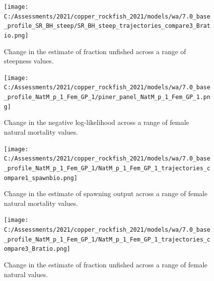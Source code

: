 \documentclass[11pt,
  english,
  a4paper,
]{article}
\begin{document}
\tagmcend\tagstructend


\begin{figure}
\centering
\texttt{[image: C:/Assessments/2021/copper\_rockfish\_2021/models/wa/7.0\_base\_profile\_SR\_BH\_steep/SR\_BH\_steep\_trajectories\_compare3\_Bratio.png]}
\caption{Change in the estimate of fraction unfished across a range of steepness values.\label{fig:h-depl}}
\end{figure}

\tagmcend\tagstructend


\begin{figure}
\centering
\texttt{[image: C:/Assessments/2021/copper\_rockfish\_2021/models/wa/7.0\_base\_profile\_NatM\_p\_1\_Fem\_GP\_1/piner\_panel\_NatM\_p\_1\_Fem\_GP\_1.png]}
\caption{Change in the negative log-likelihood across a range of female natural mortality values.\label{fig:m-profile}}
\end{figure}

\tagmcend\tagstructend


\begin{figure}
\centering
\texttt{[image: C:/Assessments/2021/copper\_rockfish\_2021/models/wa/7.0\_base\_profile\_NatM\_p\_1\_Fem\_GP\_1/NatM\_p\_1\_Fem\_GP\_1\_trajectories\_compare1\_spawnbio.png]}
\caption{Change in the estimate of spawning output across a range of female natural mortality values.\label{fig:m-ssb}}
\end{figure}

\tagmcend\tagstructend


\begin{figure}
\centering
\texttt{[image: C:/Assessments/2021/copper\_rockfish\_2021/models/wa/7.0\_base\_profile\_NatM\_p\_1\_Fem\_GP\_1/NatM\_p\_1\_Fem\_GP\_1\_trajectories\_compare3\_Bratio.png]}
\caption{Change in the estimate of fraction unfished across a range of female natural values.\label{fig:m-depl}}
\end{figure}
\end{document}
